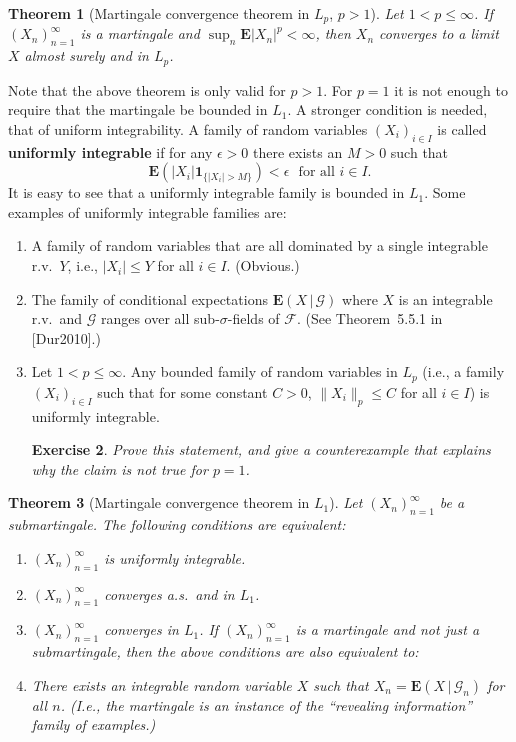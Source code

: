\documentclass[12pt]{article}
\newtheorem{thm}{Theorem}[section]
\newtheorem{exercise}[thm]{Exercise}
\newcommand{\expec}{\mathbf{E}}
\newcommand{\condexp}[2]{\expec\left(#1\,|\,#2\right)}
\newcommand{\ind}{\textbf{1}}
\theoremstyle{example}
\begin{document}
\begin{thm}[Martingale convergence theorem in $L_p$, $p>1$]
Let $1<p\le \infty$. If $(X_n)_{n=1}^\infty$ is a martingale and $\sup_n \expec |X_n|^p<\infty$, then $X_n$ converges to a limit $X$ almost surely and in $L_p$.
\end{thm}

Note that the above theorem is only valid for $p>1$. For $p=1$ it is not enough to require that the martingale be bounded in $L_1$. A stronger condition is needed, that of uniform integrability. A family of random variables $(X_i)_{i\in I}$ is called \textbf{uniformly integrable} if for any $\epsilon>0$ there exists an $M>0$ such that
$$ \expec( |X_i| \ind_{\{|X_i|>M\}} ) < \epsilon \ \ \ \textrm{for all }i\in I. $$
It is easy to see that a uniformly integrable family is bounded in $L_1$. Some examples of uniformly integrable families are:
\begin{enumerate}
\item A family of random variables that are all dominated by a single integrable r.v.\ $Y$, i.e., $|X_i|\le Y$ for all $i\in I$. (Obvious.)
\item The family of conditional expectations $\condexp{X}{\mathcal{G}}$ where $X$ is an integrable r.v.\ and $\mathcal{G}$ ranges over all sub-$\sigma$-fields of $\mathcal{F}$. (See Theorem~5.5.1 in [Dur2010].)
\item Let $1< p\le \infty$. Any bounded family of random variables in $L_p$ (i.e., a family $(X_i)_{i\in I}$ such that for some constant $C>0$, $\lVert X_i \rVert_p\le C$ for all $i\in I$) is uniformly integrable.

\begin{exercise} Prove this statement, and give a counterexample that explains why the claim is not true for $p=1$. \end{exercise}
\end{enumerate}


\begin{thm}[Martingale convergence theorem in $L_1$]
Let $(X_n)_{n=1}^\infty$ be a submartingale. The following conditions are equivalent:
\begin{enumerate}
\item $(X_n)_{n=1}^\infty$ is uniformly integrable.
\item $(X_n)_{n=1}^\infty$ converges a.s.\ and in $L_1$.
\item $(X_n)_{n=1}^\infty$ converges in $L_1$.
If $(X_n)_{n=1}^\infty$ is a martingale and not just a submartingale, then the above conditions are also equivalent to:
\item There exists an integrable random variable $X$ such that $X_n = \condexp{X}{\mathcal{G}_n}$ for all $n$. (I.e., the martingale is an instance of the ``revealing information'' family of examples.)
\end{enumerate}
\end{thm}
\end{document}
